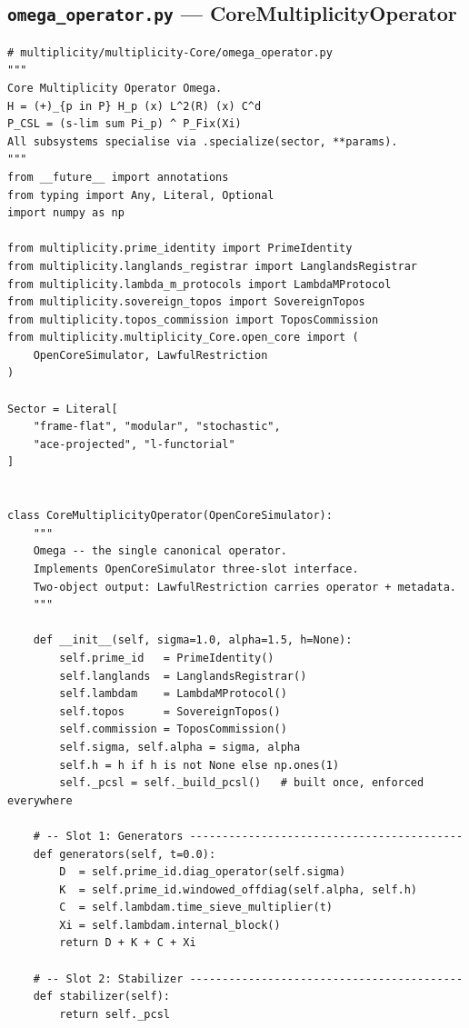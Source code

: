 \documentclass[12pt,a4paper]{article}
\theoremstyle{plain}
\theoremstyle{definition}
\theoremstyle{remark}
\begin{document}
\subsection{\texttt{omega\_operator.py} --- CoreMultiplicityOperator}
\label{sec:omega-code}

\begin{lstlisting}[caption={multiplicity/multiplicity-Core/omega\_operator.py},
  label=lst:omega]
# multiplicity/multiplicity-Core/omega_operator.py
"""
Core Multiplicity Operator Omega.
H = (+)_{p in P} H_p (x) L^2(R) (x) C^d
P_CSL = (s-lim sum Pi_p) ^ P_Fix(Xi)
All subsystems specialise via .specialize(sector, **params).
"""
from __future__ import annotations
from typing import Any, Literal, Optional
import numpy as np

from multiplicity.prime_identity import PrimeIdentity
from multiplicity.langlands_registrar import LanglandsRegistrar
from multiplicity.lambda_m_protocols import LambdaMProtocol
from multiplicity.sovereign_topos import SovereignTopos
from multiplicity.topos_commission import ToposCommission
from multiplicity.multiplicity_Core.open_core import (
    OpenCoreSimulator, LawfulRestriction
)

Sector = Literal[
    "frame-flat", "modular", "stochastic",
    "ace-projected", "l-functorial"
]


class CoreMultiplicityOperator(OpenCoreSimulator):
    """
    Omega -- the single canonical operator.
    Implements OpenCoreSimulator three-slot interface.
    Two-object output: LawfulRestriction carries operator + metadata.
    """

    def __init__(self, sigma=1.0, alpha=1.5, h=None):
        self.prime_id   = PrimeIdentity()
        self.langlands  = LanglandsRegistrar()
        self.lambdam    = LambdaMProtocol()
        self.topos      = SovereignTopos()
        self.commission = ToposCommission()
        self.sigma, self.alpha = sigma, alpha
        self.h = h if h is not None else np.ones(1)
        self._pcsl = self._build_pcsl()   # built once, enforced everywhere

    # -- Slot 1: Generators ------------------------------------------
    def generators(self, t=0.0):
        D  = self.prime_id.diag_operator(self.sigma)
        K  = self.prime_id.windowed_offdiag(self.alpha, self.h)
        C  = self.lambdam.time_sieve_multiplier(t)
        Xi = self.lambdam.internal_block()
        return D + K + C + Xi

    # -- Slot 2: Stabilizer ------------------------------------------
    def stabilizer(self):
        return self._pcsl


\end{lstlisting}
\end{document}
